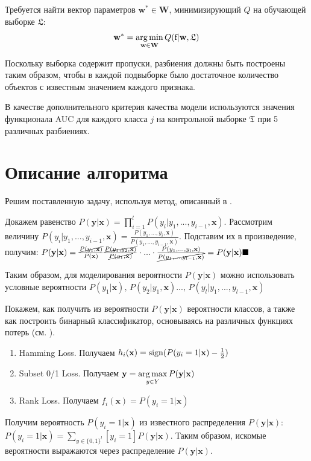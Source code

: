 \documentclass[12pt,twoside]{article}
\newcommand{\x}{\mathbf{x}}
\newcommand{\w}{\mathbf{w}}
\newcommand{\W}{\mathbf{W}}
\newcommand{\y}{\mathbf{y}}
\newcommand{\fs}{\mbox{f}}
\begin{document}
%

Требуется найти вектор параметров $\w^*\in\W$, минимизирующий $Q$ на обучающей выборке $\mathfrak{L}$:
	$$\w^*=\argmin_{\w\in\W}Q(\fs|\w,\mathfrak{L})$$

Поскольку выборка содержит пропуски, разбиения должны быть построены таким образом, чтобы в каждой подвыборке было достаточное количество объектов с известным значением каждого признака.

В качестве дополнительного критерия качества модели используются значения функционала AUC для каждого класса $j$ на контрольной выборке $\mathfrak{T}$ при 5 различных разбиениях. %

\section{Описание алгоритма}
Решим поставленную задачу, используя метод, описанный в \cite{weiwei2010}.

Докажем равенство $P(\y|\x)=\prod_{i=1}^lP(y_i|y_1,...,y_{i-1}, \x)$. Рассмотрим величину $P(y_i|y_1,...,y_{i-1},\x)=\frac{P(y_1,...,y_i,\x)}{P(y_1,...,y_{i-1},\x)}$. Подставим их в произведение, получим: $P(\y|\x)=\frac{\cancel{P(y_1,\x)}}{P(\x)}\frac{\cancel{P(y_1,y_2,\x)}}{\cancel{P(y_1,\x)}}\cdot...\cdot\frac{P(y_1,...,y_l,\x)}{\cancel{P(y_1,...,y_{l-1},\x)}}=P(\y|\x) \blacksquare$

Таким образом, для моделирования вероятности $P(\y|\x)$ можно использовать условные вероятности $P(y_1|\x),\,P(y_2|y_1,\x)...,\,P(y_l|y_1,...,y_{l-1},\x)$

Покажем, как получить из вероятности $P(\y|\x)$ вероятности классов, а также как построить бинарный классификатор, основываясь на различных функциях потерь (см. \cite{weiwei2010}).

\begin{enumerate}
\item Hamming Loss. Получаем $h_i(\x)=\sign(P(y_i=1|\x)-\frac{1}{2})$
\item Subset 0/1 Loss. Получаем $\y=\argmax_{y\in Y}P(\y|\x)$
\item Rank Loss. Получаем $f_i(\x)=P(y_i=1|\x)$
\end{enumerate}

Получим вероятность $P(y_i=1|\x)$ из известного распределения $P(\y|\x)$: $P(y_i=1|\x)=\sum\limits_{y\in \{0,1\}^l}[y_i=1]P(\y|\x)$. Таким образом, искомые вероятности выражаются через распределение $P(\y|\x)$.
\end{document}
